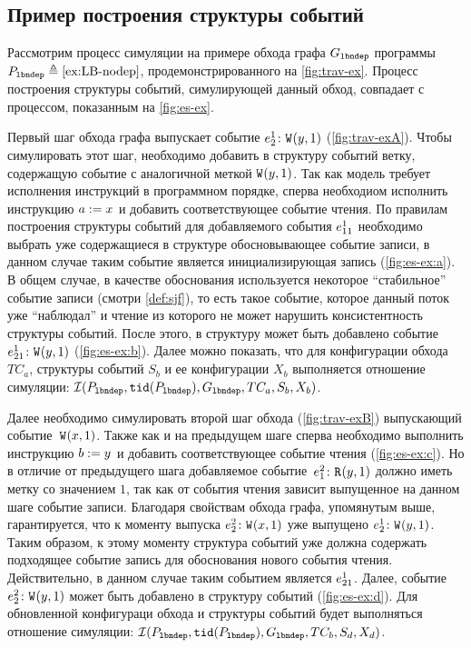 
\subsection{Пример построения структуры событий}

Рассмотрим процесс симуляции на примере
обхода графа $G_{\mathtt{lbndep}}$ программы $P_{\mathtt{lbndep}} \triangleq \text{\ref{ex:LB-nodep}}$,
продемонстрированного на \cref{fig:trav-ex}.
Процесс построения структуры событий,
симулирующей данный обход, совпадает с процессом,
показанным на \cref{fig:es-ex}.



Первый шаг обхода графа выпускает событие
$e^{1}_{2}\colon {{\mathtt{W}}}^{}({y},{1}){}$ (\cref{fig:trav-exA}).
Чтобы симулировать этот шаг, необходимо добавить
в структуру событий ветку, содержащую событие
с аналогичной меткой ${{\mathtt{W}}}^{}({y},{1}){}$.
Так как модель \Wkm требует исполнения инструкций
в программном порядке, сперва необходиом исполнить  
инструкцию $a \;{:=}\;{x}^{}$ и добавить соответствующее событие чтения.
По правилам построения структуры событий \Wkm
для добавляемого события $e^{1}_{11}$ необходимо
выбрать уже содержащиеся в структуре обосновывающее событие записи,
в данном случае таким событие является
инициализирующая запись (\cref{fig:es-ex:a}).
В общем случае, в качестве обоснования используется
некоторое ``стабильное'' событие записи (смотри \cref{def:sjf}),
то есть такое событие, которое данный поток уже ``наблюдал''
и чтение из которого не может нарушить консистентность структуры событий.
После этого, в структуру может быть добавлено событие
$e^{1}_{21}\colon {{\mathtt{W}}}^{}({y},{1})$ (\cref{fig:es-ex:b}).
Далее можно показать, что для конфигурации обхода $TC_a$,
структуры событий $S_b$ и ее конфигурации $X_b$
выполняется отношение симуляции:
$\mathcal{I}(P_{\mathtt{lbndep}}, {\mathtt{tid}}(P_{\mathtt{lbndep}}), G_{\mathtt{lbndep}}, TC_a, S_b, X_b)$.

Далее необходимо симулировать второй шаг обхода
(\cref{fig:trav-exB}) выпускающий событие~${{\mathtt{W}}}^{}({x},{1})$.
Также как и на предыдущем шаге сперва необходимо
выполнить инструкцию $b \;{:=}\;{y}^{}$ и добавить соответствующее
событие чтения (\cref{fig:es-ex:c}). Но в отличие от предыдущего шага
добавляемое событие~$e^{2}_{1}\colon {{\mathtt{R}}}^{}({y},{1})$ должно иметь
метку со значением $1$, так как от события чтения
зависит выпущенное на данном шаге событие записи.
Благодаря свойствам обхода графа, упомянутым выше,
гарантируется, что к моменту выпуска $e^{2}_{2}\colon {{\mathtt{W}}}^{}({x},{1}){}$
уже выпущено $e^{1}_{2}\colon {{\mathtt{W}}}^{}({y},{1})$.
Таким образом, к этому моменту структура событий уже должна
содержать подходящее событие запись для обоснования нового события чтения.
Действительно, в данном случае таким событием является $e^{1}_{21}$.
Далее, событие $e^{2}_{2}\colon {{\mathtt{W}}}^{}({y},{1}){}$ может быть добавлено
в структуру событий (\cref{fig:es-ex:d}).
Для обновленной конфигураци обхода и структуры событий
будет выполняться отношение симуляции:
$\mathcal{I}(P_{\mathtt{lbndep}}, {\mathtt{tid}}(P_{\mathtt{lbndep}}), G_{\mathtt{lbndep}}, TC_b, S_d, X_d)$.

